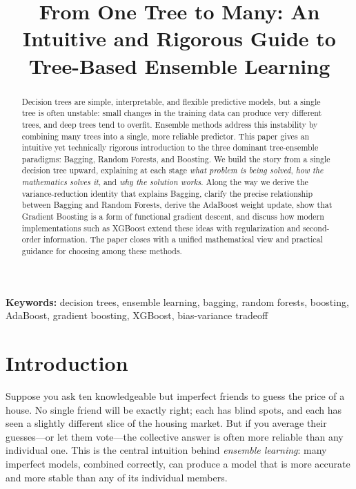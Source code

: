 \documentclass[12pt,a4paper]{article}
\title{\textbf{From One Tree to Many: An Intuitive and Rigorous Guide to Tree-Based Ensemble Learning}}
\begin{document}

\tableofcontents
\newpage
{}

\begin{abstract}
Decision trees are simple, interpretable, and flexible predictive models, but a single tree is often unstable: small changes in the training data can produce very different trees, and deep trees tend to overfit. Ensemble methods address this instability by combining many trees into a single, more reliable predictor. This paper gives an intuitive yet technically rigorous introduction to the three dominant tree-ensemble paradigms: Bagging, Random Forests, and Boosting. We build the story from a single decision tree upward, explaining at each stage \emph{what problem is being solved}, \emph{how the mathematics solves it}, and \emph{why the solution works}. Along the way we derive the variance-reduction identity that explains Bagging, clarify the precise relationship between Bagging and Random Forests, derive the AdaBoost weight update, show that Gradient Boosting is a form of functional gradient descent, and discuss how modern implementations such as XGBoost extend these ideas with regularization and second-order information. The paper closes with a unified mathematical view and practical guidance for choosing among these methods.
\end{abstract}

\noindent\textbf{Keywords:} decision trees, ensemble learning, bagging, random forests, boosting, AdaBoost, gradient boosting, XGBoost, bias-variance tradeoff

\section{Introduction}

Suppose you ask ten knowledgeable but imperfect friends to guess the price of a house. No single friend will be exactly right; each has blind spots, and each has seen a slightly different slice of the housing market. But if you average their guesses---or let them vote---the collective answer is often more reliable than any individual one. This is the central intuition behind \emph{ensemble learning}: many imperfect models, combined correctly, can produce a model that is more accurate and more stable than any of its individual members.
\end{document}
